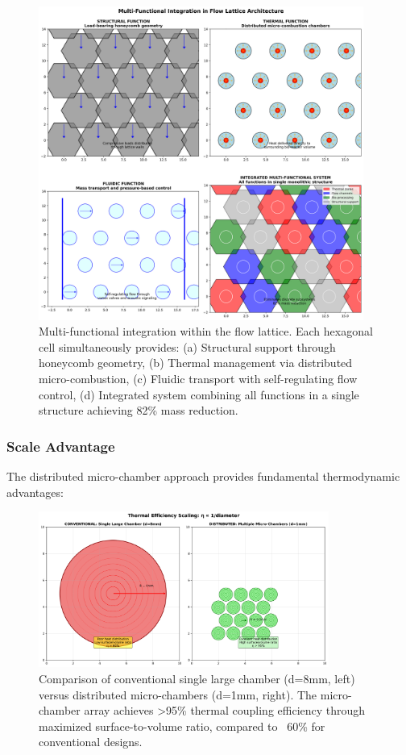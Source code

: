 \begin{figure}[H]
    \centering
    \includegraphics[width=0.95\textwidth]{figures/simulations/lattice_functional_integration.png}
    \caption{Multi-functional integration within the flow lattice. Each hexagonal cell simultaneously provides: (a) Structural support through honeycomb geometry, (b) Thermal management via distributed micro-combustion, (c) Fluidic transport with self-regulating flow control, (d) Integrated system combining all functions in a single structure achieving 82\% mass reduction.}
    \label{fig:functional_integration}
\end{figure}

\subsubsection{Scale Advantage}

The distributed micro-chamber approach provides fundamental thermodynamic advantages:

\begin{figure}[H]
    \centering
    \includegraphics[width=0.85\textwidth]{figures/simulations/chamber_scale_comparison.png}
    \caption{Comparison of conventional single large chamber (d=8mm, left) versus distributed micro-chambers (d=1mm, right). The micro-chamber array achieves >95\% thermal coupling efficiency through maximized surface-to-volume ratio, compared to ~60\% for conventional designs.}
    \label{fig:scale_comparison}
\end{figure}

